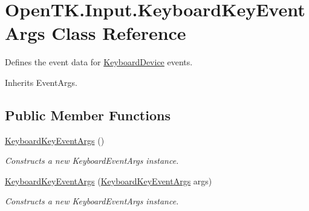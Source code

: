 \hypertarget{class_open_t_k_1_1_input_1_1_keyboard_key_event_args}{\section{Open\-T\-K.\-Input.\-Keyboard\-Key\-Event\-Args Class Reference}
\label{class_open_t_k_1_1_input_1_1_keyboard_key_event_args}
}


Defines the event data for \hyperlink{class_open_t_k_1_1_input_1_1_keyboard_device}{Keyboard\-Device} events.  




Inherits Event\-Args.

\subsection*{Public Member Functions}
\begin{DoxyCompactItemize}
\item 
\hyperlink{class_open_t_k_1_1_input_1_1_keyboard_key_event_args_a7336854e64eedc2198ca0064ff74c554}{Keyboard\-Key\-Event\-Args} ()
\begin{DoxyCompactList}\small\item\em Constructs a new Keyboard\-Event\-Args instance. \end{DoxyCompactList}\item 
\hyperlink{class_open_t_k_1_1_input_1_1_keyboard_key_event_args_ac6469a7b5ae43fc078de3949b29dc9fe}{Keyboard\-Key\-Event\-Args} (\hyperlink{class_open_t_k_1_1_input_1_1_keyboard_key_event_args}{Keyboard\-Key\-Event\-Args} args)
\begin{DoxyCompactList}\small\item\em Constructs a new Keyboard\-Event\-Args instance. \end{DoxyCompactList}\end{DoxyCompactItemize}
